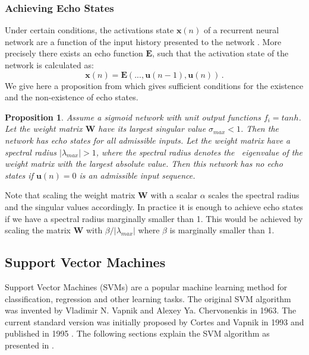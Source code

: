 \documentclass[a4paper,11pt,oneside]{article}
\newtheorem{prop}{Proposition}
\begin{document}
\subsubsection*{Achieving Echo States}
Under certain conditions, the activations state $\mathbf{x}(n)$ of a recurrent neural network are a function of 
the input history presented to the network \cite{jaeg6}. More precisely there exists an echo function $\mathbf{E}$, 
such that the activation state of the network is calculated as:
\begin{equation}
\mathbf{x}(n) = \mathbf{E}(...,\mathbf{u}(n-1),\mathbf{u}(n))\,.
\end{equation}
We give here a proposition from \cite{jaeg6} which gives sufficient conditions for the existence and the 
non-existence of echo states.
\begin{prop}
Assume a sigmoid network with unit output functions $f_i=tanh$. Let the weight matrix $\mathbf{W}$ have its 
largest singular value $\sigma_{max} <1$. Then the network has echo states for all admissible inputs. 
Let the weight matrix have a spectral radius $|\lambda_{max}| > 1$, where the spectral radius denotes the \
eigenvalue of the weight matrix with the largest absolute value. Then this network has no echo states if 
$\mathbf{u}(n)=0$ is an admissible input sequence.
\end{prop}
Note that scaling the weight matrix $\mathbf{W}$ with a scalar $\alpha$ scales the spectral radius and the 
singular values accordingly. In practice it is enough to achieve echo states if we have a spectral radius 
marginally smaller than 1. This would be achieved by scaling the matrix $\mathbf{W}$ with $\beta/|\lambda_{max}|$ 
where $\beta$ is marginally smaller than 1.
\subsection{Support Vector Machines}\label{svms}
Support Vector Machines (SVMs) are a popular machine learning method for classification, regression 
and other learning tasks. The original SVM algorithm was invented by Vladimir N. Vapnik and Alexey Ya. 
Chervonenkis in 1963. The current standard version was initially proposed by Cortes and Vapnik in 1993 
and published in 1995 \cite{cortes1995support}. The following sections explain the SVM algorithm as presented 
in \cite{fletcher2009support,law2006simple,berwick2003idiot}.
\end{document}
